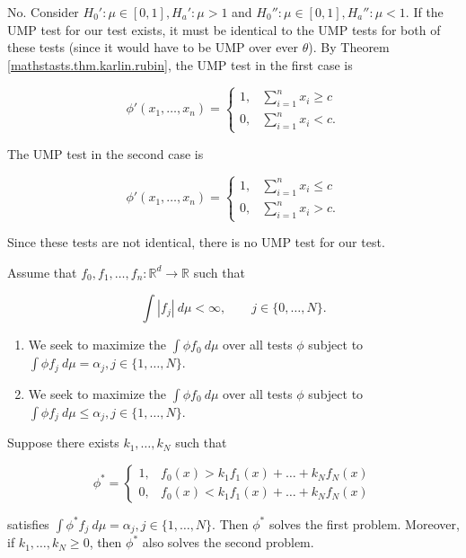 \begin{solution}

No. Consider \(H_0': \mu \in [0,1], H_a': \mu > 1\) and \(H_0'': \mu \in [0,1], H_a'': \mu < 1\). If the UMP test for our test exists, it must be identical to the UMP tests for both of these tests (since it would have to be UMP over ever \(\theta\)). By Theorem \ref{mathstasts.thm.karlin.rubin}, the UMP test in the first case is 

\[
\phi'(x_1, \ldots, x_n) = \begin{cases}
1, & \sum_{i=1}^n x_i \geq c \\
0, & \sum_{i=1}^n x_i < c.
\end{cases}
\]

The UMP test in the second case is 

\[
\phi'(x_1, \ldots, x_n) = \begin{cases}
1, & \sum_{i=1}^n x_i \leq c \\
0, & \sum_{i=1}^n x_i > c.
\end{cases}
\]

Since these tests are not identical, there is no UMP test for our test.

\end{solution}

\begin{theorem}\label{mathstats.lem.np.gen}

Assume that \(f_0, f_1, \ldots, f_n: \mathbb{R}^d \to \mathbb{R}\) such that 

\[
\int |f_j| \ d\mu < \infty, \qquad j \in \{0, \ldots, N\}.
\]

\begin{enumerate}

\item

We seek to maximize the \(\int \phi  f_0 \ d\mu \) over all tests \(\phi\) subject to \(\int \phi f_j \ d\mu = \alpha_j, j \in \{1, \ldots, N\}\). 

\item

We seek to maximize the \(\int \phi  f_0 \ d\mu \) over all tests \(\phi\) subject to \(\int \phi f_j \ d\mu \leq \alpha_j, j \in \{1, \ldots, N\}\). 

\end{enumerate}

Suppose there exists \(k_1, \ldots, k_N\) such that 

\[
\phi^* = \begin{cases}
1, & f_0(x) > k_1 f_1(x) + \ldots + k_N f_N(x) \\
0, & f_0(x) < k_1 f_1(x) + \ldots + k_N f_N(x) 
\end{cases}
\]

satisfies \(\int \phi^* f_j \ d\mu = \alpha_j, j \in \{1, \ldots, N\} \). Then \(\phi^*\) solves the first problem. Moreover, if \(k_1, \ldots, k_N \geq 0\), then \(\phi^*\) also solves the second problem.

\end{theorem}

